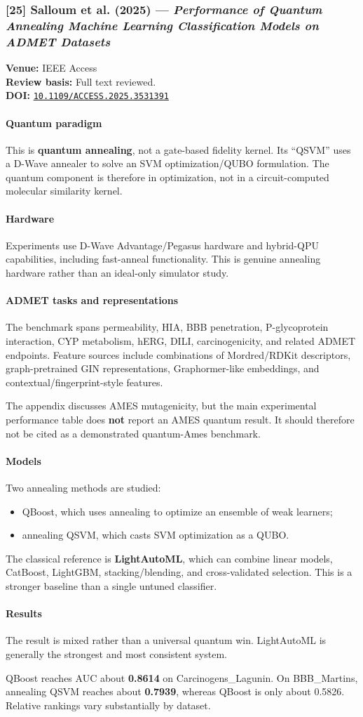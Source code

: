 \documentclass[11pt]{article}
\newcommand{\reviewfield}[2]{\paragraph{#1}#2}
\newcommand{\paperdoi}[1]{\href{https://doi.org/#1}{\texttt{#1}}}
\begin{document}
\subsubsection{[25] Salloum et al. (2025) --- \textit{Performance of Quantum Annealing Machine Learning Classification Models on ADMET Datasets}}
\textbf{Venue:} IEEE Access\\
\textbf{Review basis:} Full text reviewed.\\
\textbf{DOI:} \paperdoi{10.1109/ACCESS.2025.3531391}

\reviewfield{Quantum paradigm}{
This is \textbf{quantum annealing}, not a gate-based fidelity kernel. Its ``QSVM'' uses a D-Wave annealer to solve an SVM optimization/QUBO formulation. The quantum component is therefore in optimization, not in a circuit-computed molecular similarity kernel.
}

\reviewfield{Hardware}{
Experiments use D-Wave Advantage/Pegasus hardware and hybrid-QPU capabilities, including fast-anneal functionality. This is genuine annealing hardware rather than an ideal-only simulator study.
}

\reviewfield{ADMET tasks and representations}{
The benchmark spans permeability, HIA, BBB penetration, P-glycoprotein interaction, CYP metabolism, hERG, DILI, carcinogenicity, and related ADMET endpoints. Feature sources include combinations of Mordred/RDKit descriptors, graph-pretrained GIN representations, Graphormer-like embeddings, and contextual/fingerprint-style features.

The appendix discusses AMES mutagenicity, but the main experimental performance table does \textbf{not} report an AMES quantum result. It should therefore not be cited as a demonstrated quantum-Ames benchmark.
}

\reviewfield{Models}{
Two annealing methods are studied:
\begin{itemize}
    \item QBoost, which uses annealing to optimize an ensemble of weak learners;
    \item annealing QSVM, which casts SVM optimization as a QUBO.
\end{itemize}
The classical reference is \textbf{LightAutoML}, which can combine linear models, CatBoost, LightGBM, stacking/blending, and cross-validated selection. This is a stronger baseline than a single untuned classifier.
}

\reviewfield{Results}{
The result is mixed rather than a universal quantum win. LightAutoML is generally the strongest and most consistent system.

QBoost reaches AUC about \textbf{0.8614} on Carcinogens\_Lagunin. On BBB\_Martins, annealing QSVM reaches about \textbf{0.7939}, whereas QBoost is only about 0.5826. Relative rankings vary substantially by dataset.
}
\end{document}
